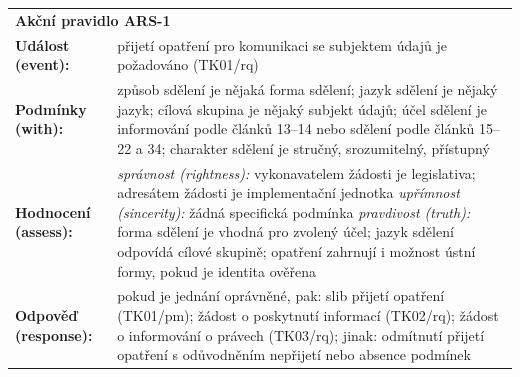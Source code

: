 \begin{itemize}
  \begin{center}
    \renewcommand{\arraystretch}{1.3}
    \begin{tabular}{p{4cm} p{8cm}}
    \multicolumn{2}{l}{\textbf{Akční pravidlo ARS-1}} \\
    \textbf{Událost (event):} & přijetí opatření pro komunikaci se subjektem údajů je požadováno (TK01/rq) \\
    \textbf{Podmínky (with):} & 
      způsob sdělení je nějaká forma sdělení; \newline
      jazyk sdělení je nějaký jazyk; \newline
      cílová skupina je nějaký subjekt údajů; \newline
      účel sdělení je informování podle článků 13–14 nebo sdělení podle článků 15–22 a 34; \newline
      charakter sdělení je stručný, srozumitelný, přístupný \\
    \textbf{Hodnocení (assess):} & 
      \textit{správnost (rightness):} \newline
      \quad vykonavatelem žádosti je legislativa; \newline
      \quad adresátem žádosti je implementační jednotka \newline
      \textit{upřímnost (sincerity):} \newline
      \quad žádná specifická podmínka \newline
      \textit{pravdivost (truth):} \newline
      \quad forma sdělení je vhodná pro zvolený účel; \newline
      \quad jazyk sdělení odpovídá cílové skupině; \newline
      \quad opatření zahrnují i možnost ústní formy, pokud je identita ověřena \\
    \textbf{Odpověď (response):} & 
      pokud je jednání oprávněné, pak: \newline
      \quad slib přijetí opatření (TK01/pm); \newline
      \quad žádost o poskytnutí informací (TK02/rq); \newline
      \quad žádost o informování o právech (TK03/rq); \newline
      jinak: \newline
      \quad odmítnutí přijetí opatření s odůvodněním nepřijetí nebo absence podmínek \\
    \end{tabular}
    \end{center}
    


\end{itemize}
